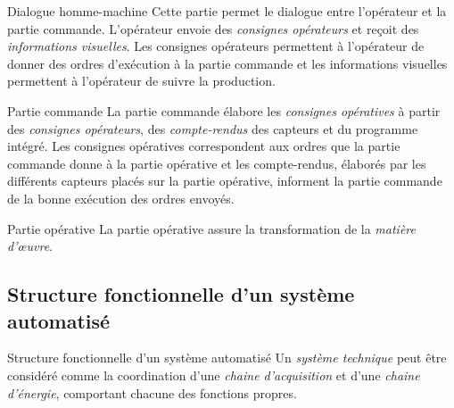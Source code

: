 

\begin{definition}{Dialogue homme-machine}{}
Cette partie permet le dialogue entre l'opérateur et la partie commande. L'opérateur envoie des \emph{consignes opérateurs} et reçoit des \emph{informations visuelles}.
Les consignes opérateurs permettent à l'opérateur de donner des ordres d'exécution à la partie commande et les informations visuelles permettent à l'opérateur de suivre la production.
\end{definition}

\begin{definition}{Partie commande}{}
La partie commande élabore les \emph{consignes opératives} à partir des \emph{consignes opérateurs}, des \emph{compte-rendus} des capteurs et du programme intégré. Les consignes opératives correspondent aux ordres que la partie commande donne à la partie opérative et les compte-rendus, élaborés par les différents capteurs placés sur la partie opérative, informent la partie commande de la bonne exécution des ordres envoyés.
\end{definition}

\begin{definition}{Partie opérative}{}
La partie opérative assure la transformation de la \emph{matière d'\oe{}uvre}.
\end{definition}

\subsection{Structure fonctionnelle d'un système automatisé}

\begin{definition}{Structure fonctionnelle d'un système automatisé}{}
Un \emph{système technique} peut être considéré comme la coordination d'une \emph{chaine d'acquisition} et d'une \emph{chaine d'énergie}, comportant chacune des fonctions propres.
\end{definition}






